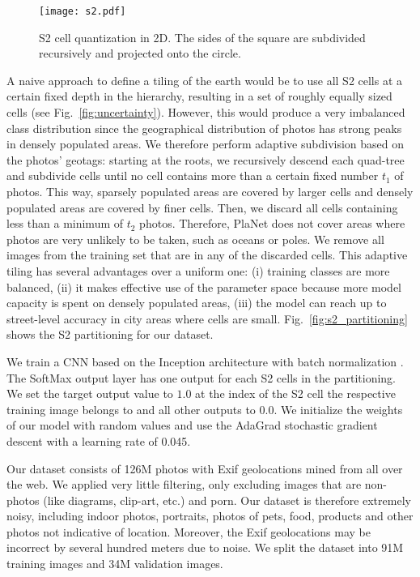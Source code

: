\documentclass[10pt,twocolumn,letterpaper]{article}
\begin{document}
\begin{figure}[t]
  \centering
  \texttt{[image: s2.pdf]}
  \caption{S2 cell quantization in 2D. The sides of the square are subdivided recursively and projected onto the circle.}
  \label{fig:s2}
\end{figure}

A naive approach to define a tiling of the earth would be to use all
S2 cells at a certain fixed depth in the hierarchy, resulting in a set
of roughly equally sized cells (see Fig.~\ref{fig:uncertainty}). However, this would produce a very
imbalanced class distribution since the geographical distribution of
photos has strong peaks in densely populated areas. We therefore
perform adaptive subdivision based on the photos' geotags: starting at the roots, we recursively
descend each quad-tree and subdivide cells until no cell contains more
than a certain fixed number $t_1$ of photos. This way, sparsely
populated areas are covered by larger cells and densely populated
areas are covered by finer cells. Then, we discard all cells
containing less than a minimum of $t_2$ photos. Therefore, PlaNet does not
cover areas where photos are very unlikely to be taken, such as oceans
or poles. We remove all images from the training set that are in
any of the discarded cells. This adaptive tiling has several
advantages over a uniform one: (i) training classes are more balanced,
(ii) it makes effective use of the parameter space because more model
capacity is spent on densely populated areas, (iii) the model can reach
up to street-level accuracy in city areas where cells are small.
Fig.~\ref{fig:s2_partitioning} shows the S2 partitioning for
our dataset.

We train a CNN based on the Inception
architecture \cite{Szegedy15CVPR} with batch
normalization \cite{Ioffe15ICML}. The SoftMax output layer has one
output for each S2 cells in the partitioning. We
set the target output value to $1.0$ at the index of the S2 cell the respective
training image belongs to and all other outputs to $0.0$. We initialize the weights of our model with random values and use the AdaGrad \cite{Duchy11JMLR} stochastic gradient descent with a learning rate of 0.045.

Our dataset consists of 126M photos with Exif geolocations
mined from all over the web. We applied very little filtering, only excluding
images that are non-photos (like diagrams, clip-art, etc.) and porn.
Our dataset is therefore extremely noisy, including indoor photos,
portraits, photos of pets, food, products and other photos not
indicative of location. Moreover, the Exif geolocations may be
incorrect by several hundred meters due to noise. We split the dataset into 91M training images and 34M validation images.
\end{document}
